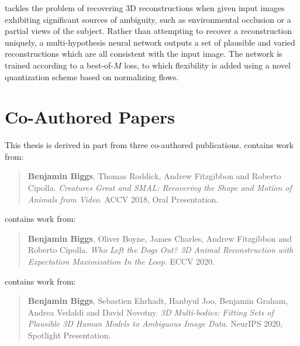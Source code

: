  tackles the problem of recovering 3D reconstructions when given input images exhibiting significant sources of ambiguity, such as environmental occlusion or a partial views of the subject. Rather than attempting to recover a reconstruction uniquely, a multi-hypothesis neural network outputs a set of plausible and varied reconstructions which are all consistent with the input image. The network is trained according to a best-of-$M$ loss, to which flexibility is added using a novel quantization scheme based on normalizing flows. 

\section{Co-Authored Papers}  %

This thesis is derived in part from three co-authored publications.  contains work from:

\begin{quote}
    \textbf{Benjamin Biggs}, Thomas Roddick, Andrew Fitzgibbon and Roberto Cipolla. \emph{Creatures Great and SMAL: Recovering the Shape and Motion of Animals from Video}. ACCV 2018, Oral Presentation.
\end{quote}

\noindent
{} contains work from:

\begin{quote}
    \textbf{Benjamin Biggs}, Oliver Boyne, James Charles, Andrew Fitzgibbon and Roberto Cipolla. \emph{Who Left the Dogs Out? 3D Animal Reconstruction with Expectation Maximization In the Loop}. ECCV 2020.
\end{quote}

\noindent
{} contains work from:

\begin{quote}
    \textbf{Benjamin Biggs}, Sebastien Ehrhadt, Hanbyul Joo, Benjamin Graham, Andrea Vedaldi and David Novotny. \emph{3D Multi-bodies: Fitting Sets of Plausible 3D Human Models to Ambiguous Image Data}. NeurIPS 2020, Spotlight Presentation.
\end{quote}